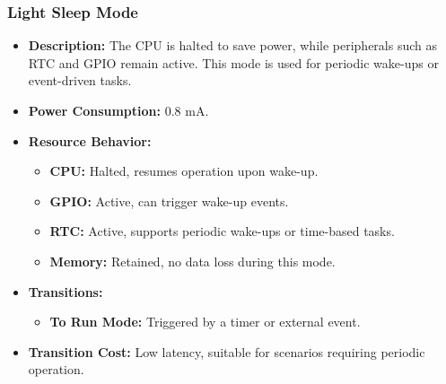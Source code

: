 \documentclass[a4paper, 11pt]{article}
\begin{document}
    \subsubsection*{Light Sleep Mode}
    \begin{itemize}
        \item \textbf{Description:} The CPU is halted to save power, while peripherals such as RTC and GPIO remain active. This mode is used for periodic wake-ups or event-driven tasks.
        \item \textbf{Power Consumption:} 0.8 mA.
        \item \textbf{Resource Behavior:}
        \begin{itemize}
            \item \textbf{CPU:} Halted, resumes operation upon wake-up.
            \item \textbf{GPIO:} Active, can trigger wake-up events.
            \item \textbf{RTC:} Active, supports periodic wake-ups or time-based tasks.
            \item \textbf{Memory:} Retained, no data loss during this mode.
        \end{itemize}
        \item \textbf{Transitions:}
        \begin{itemize}
            \item \textbf{To Run Mode:} Triggered by a timer or external event.
        \end{itemize}
        \item \textbf{Transition Cost:} Low latency, suitable for scenarios requiring periodic operation.
    \end{itemize}
    
\end{document}
